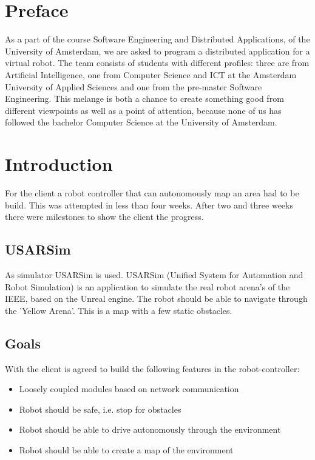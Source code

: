 \documentclass[titlepage, a4paper,10pt]{article}
\begin{document}


\tableofcontents 
\newpage

\section{Preface}
As a part of the course Software Engineering and Distributed Applications, of
the University of Amsterdam, we are asked to program a distributed application
for a virtual robot. The team consists of students with different profiles:
three are from Artificial Intelligence, one from Computer Science and ICT at the
Amsterdam University of Applied Sciences and one from the pre-master Software
Engineering. This melange is both a chance to create something good from
different viewpoints as well as a point of attention, because none of us has
followed the bachelor Computer Science at the University of Amsterdam. 

\newpage

\section{Introduction}
For the client a robot controller that can autonomously map an area had to be build. This was attempted in less than four weeks. After two and three weeks there were milestones to show the client the progress.

\subsection{USARSim}
As simulator USARSim is used. USARSim (Unified System for Automation and Robot Simulation) is an application to simulate the real robot arena's of the IEEE, based on the Unreal engine. The robot should be able to navigate through the 'Yellow Arena'. This is a map with a few static obstacles.

\subsection{Goals}
With the client is agreed to build the following features in the robot-controller:
\begin{itemize}
\item Loosely coupled modules based on network communication
\item Robot should be safe, i.e. stop for obstacles
\item Robot should be able to drive autonomously through the environment
\item Robot should be able to create a map of the environment
\end{itemize}
\end{document}
